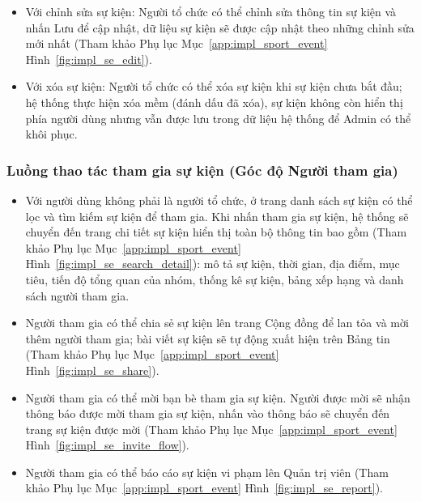 \begin{itemize}
\begin{itemize}
        \item Với chỉnh sửa sự kiện: Người tổ chức có thể chỉnh sửa thông tin sự kiện và nhấn Lưu để cập nhật, dữ liệu sự kiện sẽ được cập nhật theo những chỉnh sửa mới nhất (Tham khảo Phụ lục Mục~\ref{app:impl_sport_event} Hình~\ref{fig:impl_se_edit}).


        \item Với xóa sự kiện: Người tổ chức có thể xóa sự kiện khi sự kiện chưa bắt đầu; hệ thống thực hiện xóa mềm (đánh dấu đã xóa), sự kiện không còn hiển thị phía người dùng nhưng vẫn được lưu trong dữ liệu hệ thống để Admin có thể khôi phục.

    \end{itemize}
\end{itemize}

\subsubsection{Luồng thao tác tham gia sự kiện (Góc độ Người tham gia)}
\begin{itemize}
    \item Với người dùng không phải là người tổ chức, ở trang danh sách sự kiện có thể lọc và tìm kiếm sự kiện để tham gia. Khi nhấn tham gia sự kiện, hệ thống sẽ chuyển đến trang chi tiết sự kiện hiển thị toàn bộ thông tin bao gồm (Tham khảo Phụ lục Mục~\ref{app:impl_sport_event} Hình~\ref{fig:impl_se_search_detail}): mô tả sự kiện, thời gian, địa điểm, mục tiêu, tiến độ tổng quan của nhóm, thống kê sự kiện, bảng xếp hạng và danh sách người tham gia.


    \item Người tham gia có thể chia sẻ sự kiện lên trang Cộng đồng để lan tỏa và mời thêm người tham gia; bài viết sự kiện sẽ tự động xuất hiện trên Bảng tin (Tham khảo Phụ lục Mục~\ref{app:impl_sport_event} Hình~\ref{fig:impl_se_share}).


    \item Người tham gia có thể mời bạn bè tham gia sự kiện. Người được mời sẽ nhận thông báo được mời tham gia sự kiện, nhấn vào thông báo sẽ chuyển đến trang sự kiện được mời (Tham khảo Phụ lục Mục~\ref{app:impl_sport_event} Hình~\ref{fig:impl_se_invite_flow}).


    \item Người tham gia có thể báo cáo sự kiện vi phạm lên Quản trị viên (Tham khảo Phụ lục Mục~\ref{app:impl_sport_event} Hình~\ref{fig:impl_se_report}).

\end{itemize}

